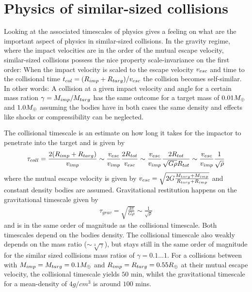 \section{Physics of similar-sized collisions}
Looking at the associated timescales of physics gives a feeling on what are the important aspect of physics in similar-sized collisions. In the gravity regime, where the impact velocities are in the order of the mutual escape velocity, similar-sized collisions possess the nice property scale-invariance on the first order: When the impact velocity is scaled to the escape velocity $v_{esc}$ and time to the collisional time $t_{col} = ( R_{imp} + R_{targ} ) / v_{esc}$ the collision becomes self-similar. In other words: A collision at a given impact velocity and angle for a certain mass ration $\gamma = M_{imp} / M_{targ}$ has the same outcome for a target mass of $0.01 M_{\oplus}$ and $1.0 M_{\oplus}$ assuming the bodies have in both cases the same density and effects like shocks or compressibility can be neglected.

The collisional timescale is an estimate on how long it takes for the impactor to penetrate into the target and is given by
\begin{align}
\tau_{coll} = \frac{2 (R_{imp} + R_{targ})}{v_{imp}} \sim \frac{v_{esc}}{v_{imp}} \frac{2 R_{tot}}{v_{esc}} \sim \frac{v_{esc}}{v_{imp}}  \frac{2 R_{tot}}{\sqrt{G \rho} R_{tot}} \sim \frac{v_{esc}}{v_{imp}} \frac{1}{\sqrt{\rho}}
\end{align}
where the mutual escape velocity is given by $v_{esc} = \sqrt{ 2 G \frac{M_{targ} + M_{imp}}{R_{targ} + R_{imp}} }$ and constant density bodies are assumed. Gravitational restitution happens on the gravitational timescale given by
\begin{align}
\tau_{grav} = \sqrt{\frac{3 \pi }{G \rho} } \sim \frac{1}{\sqrt{\rho}}
\end{align}
and is in the same order of magnitude as the collisional timescale. Both timescales depend on the bodies density. The collisional timescale also weakly depends on the mass ratio ($\sim \sqrt[3]{\gamma}$), but stays still in the same order of magnitude for the similar sized collisions mass ratios of $\gamma = 0.1 \dots 1$. For a collisions between with $M_{imp} = M_{targ} = 0.1M_{\oplus}$ and $R_{imp} = R_{targ} = 0.55 R_{\oplus}$ at their mutual escape velocity, the collisional timescale yields $50$ min, whilst the gravitational timescale for a mean-density of $4g/cm^3$ is around $100$ mins. 

